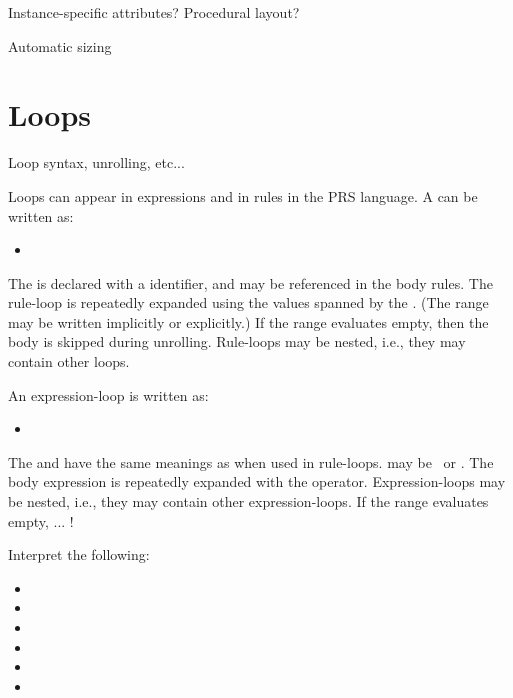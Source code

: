 Instance-specific attributes?
Procedural layout?

Automatic sizing

\section{Loops}
\label{sec:prs:loops}

Loop syntax, unrolling, etc...

Loops can appear in expressions and in rules in the PRS language.  
A  can be written as:

\begin{itemize}
\item \ttt{(:}  \ttt{:}  \ttt{:}
	 \ttt{)}
\end{itemize}

The  is declared with a identifier, and may be referenced
in the body rules.  
The rule-loop is repeatedly expanded using the values spanned
by the .  
(The range may be written implicitly or explicitly.)
If the range evaluates empty, then the body is skipped during unrolling.  
Rule-loops may be nested, i.e., they may contain other loops.  

An expression-loop is written as:
\begin{itemize}
\item \ttt{(}  \ttt{:}  \ttt{:}  \ttt{:}
	 \ttt{)}
\end{itemize}
The  and  have the same meanings as when used
in rule-loops.  
 may be \prsand\ or \prsor.  
The body expression is repeatedly expanded with the  operator.  
Expression-loops may be nested, i.e., they may contain other expression-loops.  
If the range evaluates empty, ...
!

Interpret the following:
\begin{itemize}
\item {}
\item {}
\item {}
\item {}
\item {}
\item {}
\end{itemize}

